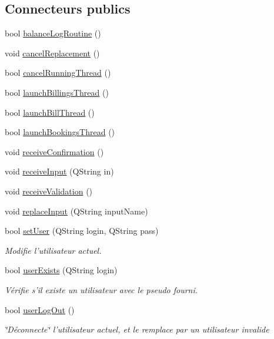 \subsection*{Connecteurs publics}
\begin{DoxyCompactItemize}
\item 
bool \hyperlink{classSH__ApplicationCore_a008b4a797ce77f88df8c59226a151708}{balance\-Log\-Routine} ()
\item 
void \hyperlink{classSH__ApplicationCore_a9976ff6a371d6fe4c97cc37692584ff1}{cancel\-Replacement} ()
\item 
bool \hyperlink{classSH__ApplicationCore_a1877174428cec5165c2c2f317086a9b7}{cancel\-Running\-Thread} ()
\item 
bool \hyperlink{classSH__ApplicationCore_aa0777211696005ec89b2effe06190c3b}{launch\-Billings\-Thread} ()
\item 
bool \hyperlink{classSH__ApplicationCore_ab72fd6cdc47575d47157fc7bdffae8f2}{launch\-Bill\-Thread} ()
\item 
bool \hyperlink{classSH__ApplicationCore_af70c0875c93910b83acbcd49e56bf0fb}{launch\-Bookings\-Thread} ()
\item 
void \hyperlink{classSH__ApplicationCore_a15cce25dbf982bc8fc391ddfb4d1fd24}{receive\-Confirmation} ()
\item 
void \hyperlink{classSH__ApplicationCore_a2191031eaee203587c1897791ddefbc4}{receive\-Input} (Q\-String in)
\item 
void \hyperlink{classSH__ApplicationCore_a6d40bb4cca2fe9e091dd369518d08ce0}{receive\-Validation} ()
\item 
void \hyperlink{classSH__ApplicationCore_a82123e26fba2d137cbf356b4aaf2078e}{replace\-Input} (Q\-String input\-Name)
\item 
bool \hyperlink{classSH__ApplicationCore_a2dd5c029a2ea348f1dfd0a60dea476e4}{set\-User} (Q\-String login, Q\-String pass)
\begin{DoxyCompactList}\small\item\em Modifie l'utilisateur actuel. \end{DoxyCompactList}\item 
bool \hyperlink{classSH__ApplicationCore_a63afe07c7ef380f8709854aba85fdb9e}{user\-Exists} (Q\-String login)
\begin{DoxyCompactList}\small\item\em Vérifie s'il existe un utilisateur avec le pseudo fourni. \end{DoxyCompactList}\item 
bool \hyperlink{classSH__ApplicationCore_a3603a68faa57edb8722f9d1b67767368}{user\-Log\-Out} ()
\begin{DoxyCompactList}\small\item\em \char`\"{}\-Déconnecte\char`\"{} l'utilisateur actuel, et le remplace par un utilisateur invalide \end{DoxyCompactList}\end{DoxyCompactItemize}
